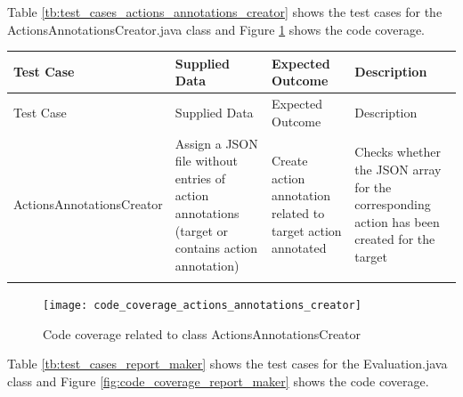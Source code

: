 Table \ref{tb:test_cases_actions_annotations_creator} shows the test cases for the ActionsAnnotationsCreator.java class and Figure \ref{fig:code_coverage_actions_annotations_creator} shows the code coverage.

\thispagestyle{empty}
	\begingroup
	\centering
	\scriptsize
	\renewcommand{\arraystretch}{1,5} 
	\keepXColumns
	\begin{tabularx}{\textwidth}{X  X  X  X}		
		\hline
		Test Case &Supplied Data&Expected Outcome&Description\\
		\hline\hline
		\endfirsthead
		\hline
		Test Case &Supplied Data&Expected Outcome&Description\\
		\hline\hline
		\endhead
		ActionsAnnotationsCreator&Assign a JSON file without entries of action annotations (target or contains action annotation)&Create action annotation related to target action annotated&Checks whether the JSON array for the corresponding action has been created for the target\\
		
		
		\hline
		\caption{Test cases for ActionsAnnotationsCreator class}\label{tb:test_cases_actions_annotations_creator}
	\end{tabularx}		
	\endgroup
	
	\begin{figure}[h]
		\centering
		\texttt{[image: code\_coverage\_actions\_annotations\_creator]}
		\caption{Code coverage related to class ActionsAnnotationsCreator}\label{fig:code_coverage_actions_annotations_creator}
	\end{figure} 
	
Table \ref{tb:test_cases_report_maker} shows the test cases for the Evaluation.java class and Figure \ref{fig:code_coverage_report_maker} shows the code coverage.

\begingroup
\centering
\scriptsize
\renewcommand{\arraystretch}{1,5} 
\keepXColumns

